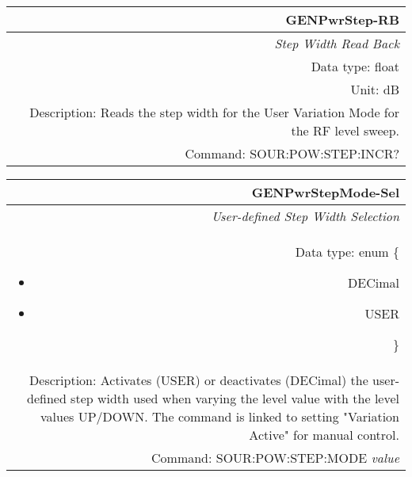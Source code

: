 \documentclass[openany]{article}
\begin{document}
		\begin{tabular}{N}
			\hline
			\bfseries GENPwrStep-RB \\ \hline
			\emph{Step Width Read Back} \\
			Data type: float \\
			Unit: dB \\
			Description: Reads the step width for the User Variation Mode for the RF level sweep. \\
			Command: SOUR:POW:STEP:INCR? \\

		\end{tabular}
%
		\begin{tabular}{N}
			\hline
			\bfseries GENPwrStepMode-Sel \\ \hline
			\emph{User-defined Step Width Selection} \\
			Data type: enum \{\begin{itemize}[noitemsep]
				\small
				\item[] DECimal
				\item[] USER
			\end{itemize}\} \\
			Description: Activates (USER) or deactivates (DECimal) the user-defined step width used when varying the level value with the level values UP/DOWN. The command is linked to setting "Variation Active" for manual control. \\
			Command: SOUR:POW:STEP:MODE \emph{value} \\

		\end{tabular}
\end{document}
